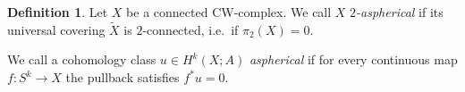 \documentclass[a4paper,twoside]{article}
\theoremstyle{plain}
\theoremstyle{definition}
\newtheorem{definition}[theorem]{Definition}
\theoremstyle{remark}
\newcommand{\integers}{\mathbb{Z}}
\DeclareMathOperator{\TC}{TC}
\begin{document}








\begin{definition}
  Let $X$ be a connected CW-complex. We call $X$ \emph{$2$-aspherical} if its
  universal covering $\tilde X$ is $2$-connected, i.e.~if $\pi_2(X)=0$.

  We call a cohomology class $u\in H^k(X;A)$ \emph{aspherical} if for every
  continuous map $f\colon S^k\to X$ the pullback satisfies $f^*u=0$. 
\end{definition}
\end{document}
